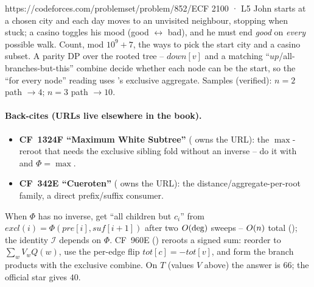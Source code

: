 \begin{practiceset}
    {https://codeforces.com/problemset/problem/852/E}{CF 2100 · L5}
    {John starts at a chosen city and each day moves to an unvisited neighbour,
    stopping when stuck; a casino toggles his mood (good $\leftrightarrow$ bad),
    and he must end \emph{good} on \emph{every} possible walk. Count, mod
    $10^9{+}7$, the ways to pick the start city and a casino subset. A parity
    DP over the rooted tree -- $\mathit{down}[v]$ and a matching
    ``$\mathit{up}$/all-branches-but-this'' combine decide whether each node can
    be the start, so the ``for every node'' reading uses
    's exclusive aggregate. Samples (verified): $n=2$ path
    $\to 4$; $n=3$ path $\to 10$.
    }
\end{practiceset}

\paragraph{Back-cites (URLs live elsewhere in the book).}
\begin{itemize}[nosep,leftmargin=1.4em]
  \item \textbf{CF~1324F ``Maximum White Subtree''} ( owns the URL):
        the $\max$-reroot that needs the exclusive sibling fold without an
        inverse -- do it with  and $\Phi=\max$.
  \item \textbf{CF~342E ``Cueroten''} ( owns the URL): the
        distance/aggregate-per-root family, a direct prefix/suffix consumer.
\end{itemize}

\begin{recallbox}
When $\Phi$ has no inverse, get ``all children but $c_i$'' from
$\mathit{excl}(i)=\Phi(\mathit{pre}[i],\mathit{suf}[i{+}1])$ after two
$O(\deg)$ sweeps -- $O(n)$ total (); the
identity $\mathcal{I}$ depends on $\Phi$. CF~960E ()
reroots a signed sum: reorder to $\sum_w V_wQ(w)$, use the per-edge flip
$\mathit{tot}[c]=-\mathit{tot}[v]$, and form the branch products with the
exclusive combine. On $T$ (values $V$ above) the answer is $66$; the official
star gives $40$.
\end{recallbox}
